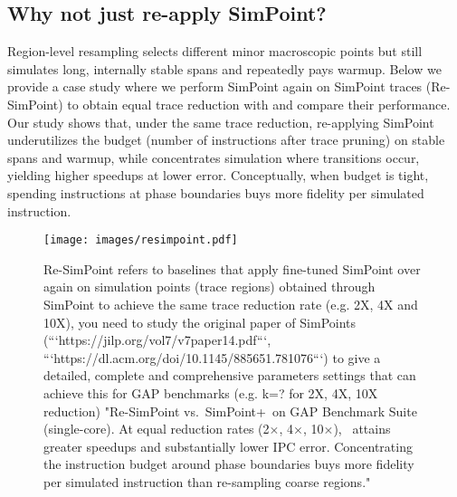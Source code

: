 \subsection*{Why not just re-apply SimPoint?}
Region-level resampling selects different minor macroscopic points but still simulates long, internally stable spans and repeatedly pays warmup. Below we provide a case study where we perform SimPoint again on SimPoint traces (Re-SimPoint) to obtain equal trace reduction with \name and compare their performance. Our study shows that, under the same trace reduction, re-applying SimPoint underutilizes the budget (number of instructions after trace pruning) on stable spans and warmup, while \name concentrates simulation where transitions occur, yielding higher speedups at lower error. Conceptually, when budget is tight, spending instructions at phase boundaries buys more fidelity per simulated instruction.
 
\begin{figure}[!htbp]
    \centering
    \setlength{\belowcaptionskip}{-10pt}
    \captionsetup{skip=0pt}
    \captionsetup[subfigure]{font=footnotesize, skip=1pt}
    \texttt{[image: images/resimpoint.pdf]}
    \caption{Re-SimPoint refers to baselines that apply fine-tuned SimPoint over again on simulation points (trace regions) obtained through SimPoint to achieve the same trace reduction rate (e.g. 2X, 4X and 10X), you need to study the original paper of SimPoints (```https://jilp.org/vol7/v7paper14.pdf```, ```https://dl.acm.org/doi/10.1145/885651.781076```) to give a detailed, complete and comprehensive parameters settings that can achieve this for GAP benchmarks (e.g. k=? for 2X, 4X, 10X reduction) "Re-SimPoint vs.\ SimPoint+\name\ on GAP Benchmark Suite (single-core). At equal reduction rates (2$\times$, 4$\times$, 10$\times$), \name\ attains greater speedups and substantially lower IPC error. Concentrating the instruction budget around phase boundaries buys more fidelity per simulated instruction than re-sampling coarse regions."}  
    \label{fig:benchmarks}
\end{figure}
